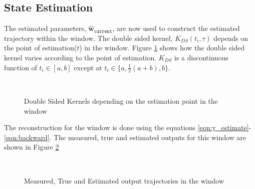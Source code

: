 \documentclass[letterpaper%
, twoside%
, 12pt%
,memoire%
, english%
,creativecommons,hyperref%
]{thETS}
\begin{document}
\FloatBarrier
\subsection{State Estimation}
The estimated parameters, $\hat{\textbf{w}}_{\texttt{current}}$, are now used to construct the estimated trajectory within the window. The double sided kernel, $K_{DS}(t_i,\tau)$ depends on the point of estimation($t$) in the window. Figure \ref{Fig:kernels} shows how the double sided kernel varies according to the point of estimation. $K_{DS}$ is a discontinuous function of $t_i\in[a,b]$ except at $t_i\in \{a, \frac{1}{2}(a+b), b\}$. 
\begin{figure} [H]
	\centering	{}
	 \\ \parbox{0.75\textwidth}{\caption{Double Sided Kernels depending on the estimation point in the window\label{Fig:kernels}}}
\end{figure}
The reconstruction for the window is done using the equations \eqref{eqn:y_estimate}-\eqref{eqn:backward}. The measured, true and estimated outputs for this window are shown in Figure \ref{Fig:winEst}
\begin{figure}
	\centering	{}
	 \\ \parbox{0.75\textwidth}{\caption{Measured, True and Estimated output trajectories in the window\label{Fig:winEst}}}
\end{figure}
\end{document}
